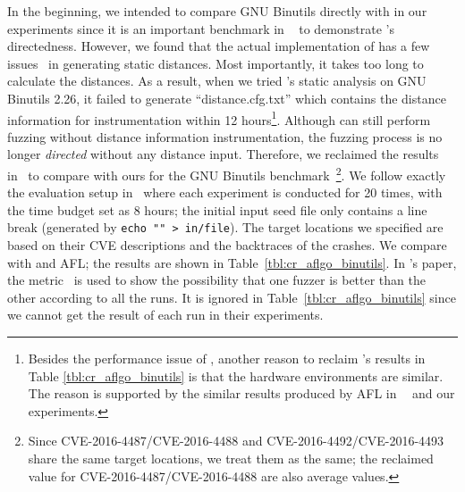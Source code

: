 In the beginning, we intended to compare GNU Binutils directly with {\aflgo} in our experiments since it is an important benchmark in ~\cite{Bohme:2017:DGF} to demonstrate {\aflgo}'s directedness. However, we found that the actual implementation of {\aflgo} has a few issues~\cite{aflgo_issues} in generating static distances. Most importantly, it takes too long to calculate the distances. As a result, when we tried {\aflgo}'s static analysis on GNU Binutils 2.26, it failed to generate ``distance.cfg.txt'' which contains the distance information for instrumentation within 12 hours\footnote{{Besides the performance issue of \aflgo, another reason to reclaim \aflgo's results in Table \ref{tbl:cr_aflgo_binutils} is that the hardware environments are similar. The reason is supported by the similar results produced by AFL in \textbf{~\cite{Bohme:2017:DGF}} and our experiments.}}. Although {\aflgo} can still perform fuzzing without distance information instrumentation, the fuzzing process is no longer \emph{directed} without any distance input.
Therefore, we reclaimed the results in~\cite{Bohme:2017:DGF} to compare with ours for the GNU Binutils benchmark~\footnote{Since CVE-2016-4487/CVE-2016-4488 and CVE-2016-4492/CVE-2016-4493 share the same target locations, we treat them as the same; the reclaimed value for CVE-2016-4487/CVE-2016-4488 are also average values.}. We follow exactly the evaluation setup in~\cite{Bohme:2017:DGF} where each experiment is conducted for 20 times, with the time budget set as 8 hours; the initial input seed file only contains a line break (generated by \verb|echo "" > in/file|). The target locations we specified are based on their CVE descriptions and the backtraces of the crashes. We compare {\dFOT} with {\aflgo} and AFL; the results are shown in Table~\ref{tbl:cr_aflgo_binutils}. In {\aflgo}'s paper, the {\alz} metric~\cite{alz_metric} is used to show the possibility that one fuzzer is better than the other according to all the runs. It is ignored in Table~\ref{tbl:cr_aflgo_binutils} since we cannot get the result of each run in their experiments.

